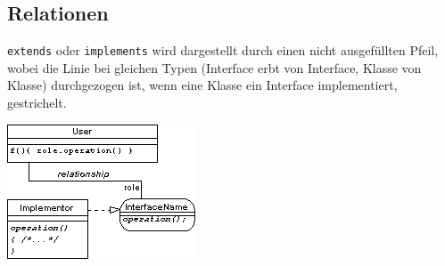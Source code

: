 \documentclass[12pt,a4]{article}
\begin{document}
	 \subsection{Relationen}

 	\texttt{extends} oder \texttt{implements} wird dargestellt durch einen nicht ausgefüllten Pfeil, wobei die Linie bei gleichen Typen (Interface erbt von Interface, Klasse von Klasse) durchgezogen ist, wenn eine Klasse ein Interface implementiert, gestrichelt.
 	
 	\begin{center}
 		\includegraphics[width=0.5\linewidth]{images/interface1}
 	\end{center}

		
	 
\end{document}
